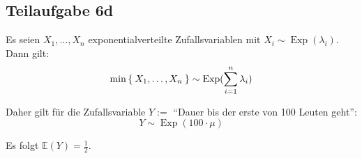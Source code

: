 \documentclass[a4paper]{scrartcl}
\begin{document}
\subsection*{Teilaufgabe 6d}
Es seien $X_1, \dots, X_n$ exponentialverteilte Zufallsvariablen mit $X_i \sim \operatorname{Exp}(\lambda_i)$.
Dann gilt:
\[\min\Set{X_1, \dots, X_n} \sim \operatorname{Exp}(\sum_{i=1}^n \lambda_i)\]

Daher gilt für die Zufallsvariable $Y := $ \enquote{Dauer bis der erste von 100 Leuten geht}:
\[Y \sim \operatorname{Exp}(100 \cdot \mu)\]

Es folgt $\mathbb{E}(Y) = \frac{1}{2}$.
\end{document}
